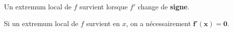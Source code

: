 \documentclass[14pt]{beamer}
\theoremstyle{plain}
\theoremstyle{definition}
\begin{document}
\begin{frame}

		\begin{center}
			Un extremum local de $f$ survient lorsque $f'$ change de \pause \textbf{signe}. \pause
		\end{center}
		
		\begin{center}
			Si un extremum local de $f$ survient en $x$, on a nécessairement \pause $\mathbf{f'(x) = 0}$.
		\end{center}

\end{frame}
\end{document}
